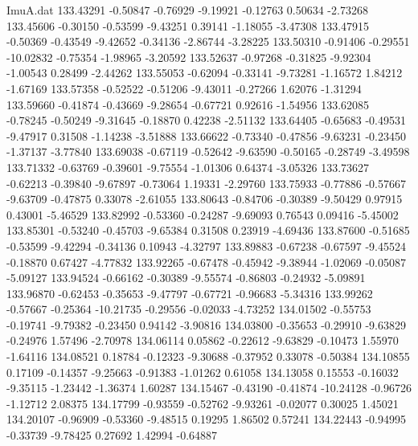 \begin{filecontents}{ImuA.dat}
 133.43291   -0.50847   -0.76929   -9.19921   -0.12763    0.50634   -2.73268
 133.45606   -0.30150   -0.53599   -9.43251    0.39141   -1.18055   -3.47308
 133.47915   -0.50369   -0.43549   -9.42652   -0.34136   -2.86744   -3.28225
 133.50310   -0.91406   -0.29551  -10.02832   -0.75354   -1.98965   -3.20592
 133.52637   -0.97268   -0.31825   -9.92304   -1.00543    0.28499   -2.44262
 133.55053   -0.62094   -0.33141   -9.73281   -1.16572    1.84212   -1.67169
 133.57358   -0.52522   -0.51206   -9.43011   -0.27266    1.62076   -1.31294
 133.59660   -0.41874   -0.43669   -9.28654   -0.67721    0.92616   -1.54956
 133.62085   -0.78245   -0.50249   -9.31645   -0.18870    0.42238   -2.51132
 133.64405   -0.65683   -0.49531   -9.47917    0.31508   -1.14238   -3.51888
 133.66622   -0.73340   -0.47856   -9.63231   -0.23450   -1.37137   -3.77840
 133.69038   -0.67119   -0.52642   -9.63590   -0.50165   -0.28749   -3.49598
 133.71332   -0.63769   -0.39601   -9.75554   -1.01306    0.64374   -3.05326
 133.73627   -0.62213   -0.39840   -9.67897   -0.73064    1.19331   -2.29760
 133.75933   -0.77886   -0.57667   -9.63709   -0.47875    0.33078   -2.61055
 133.80643   -0.84706   -0.30389   -9.50429    0.97915    0.43001   -5.46529
 133.82992   -0.53360   -0.24287   -9.69093    0.76543    0.09416   -5.45002
 133.85301   -0.53240   -0.45703   -9.65384    0.31508    0.23919   -4.69436
 133.87600   -0.51685   -0.53599   -9.42294   -0.34136    0.10943   -4.32797
 133.89883   -0.67238   -0.67597   -9.45524   -0.18870    0.67427   -4.77832
 133.92265   -0.67478   -0.45942   -9.38944   -1.02069   -0.05087   -5.09127
 133.94524   -0.66162   -0.30389   -9.55574   -0.86803   -0.24932   -5.09891
 133.96870   -0.62453   -0.35653   -9.47797   -0.67721   -0.96683   -5.34316
 133.99262   -0.57667   -0.25364  -10.21735   -0.29556   -0.02033   -4.73252
 134.01502   -0.55753   -0.19741   -9.79382   -0.23450    0.94142   -3.90816
 134.03800   -0.35653   -0.29910   -9.63829   -0.24976    1.57496   -2.70978
 134.06114    0.05862   -0.22612   -9.63829   -0.10473    1.55970   -1.64116
 134.08521    0.18784   -0.12323   -9.30688   -0.37952    0.33078   -0.50384
 134.10855    0.17109   -0.14357   -9.25663   -0.91383   -1.01262    0.61058
 134.13058    0.15553   -0.16032   -9.35115   -1.23442   -1.36374    1.60287
 134.15467   -0.43190   -0.41874  -10.24128   -0.96726   -1.12712    2.08375
 134.17799   -0.93559   -0.52762   -9.93261   -0.02077    0.30025    1.45021
 134.20107   -0.96909   -0.53360   -9.48515    0.19295    1.86502    0.57241
 134.22443   -0.94995   -0.33739   -9.78425    0.27692    1.42994   -0.64887

\end{filecontents}
